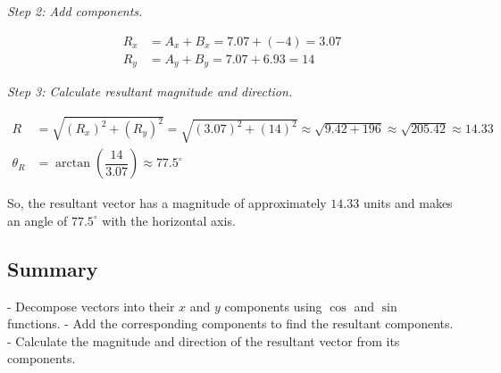 \documentclass{article}
\begin{document}
\begin{multicols}{2}
\textit{Step 2: Add components.}

\[
\begin{aligned}
R_x &= A_x + B_x = 7.07 + (-4) = 3.07 \\
R_y &= A_y + B_y = 7.07 + 6.93 = 14
\end{aligned}
\]

\textit{Step 3: Calculate resultant magnitude and direction.}

\[
\begin{aligned}
R &= \sqrt{(R_x)^2 + (R_y)^2} = \sqrt{(3.07)^2 + (14)^2} \approx \sqrt{9.42 + 196} \approx \sqrt{205.42} \approx 14.33 \\
\theta_R &= \arctan\left( \dfrac{14}{3.07} \right) \approx 77.5^\circ
\end{aligned}
\]

So, the resultant vector has a magnitude of approximately \( 14.33 \) units and makes an angle of \( 77.5^\circ \) with the horizontal axis.

\subsection*{Summary}

- Decompose vectors into their \( x \) and \( y \) components using \( \cos \) and \( \sin \) functions.
- Add the corresponding components to find the resultant components.
- Calculate the magnitude and direction of the resultant vector from its components.

\end{multicols}
\end{document}
